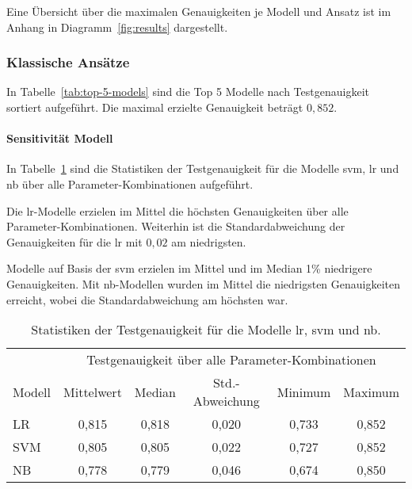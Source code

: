 Eine Übersicht über die maximalen Genauigkeiten je Modell und Ansatz ist im Anhang in Diagramm~\ref{fig:results} dargestellt.

\subsubsection{Klassische Ansätze}\label{subsubsec:ergebnisse-klassische-ansaetze}

In Tabelle~\ref{tab:top-5-models} sind die Top 5 Modelle nach Testgenauigkeit sortiert aufgeführt.
Die maximal erzielte Genauigkeit beträgt $0,852$.

\paragraph{Sensitivität Modell}
In Tabelle~\ref{tab:stats-per-model} sind die Statistiken der Testgenauigkeit für die Modelle \gls{svm}, \gls{lr} und \gls{nb} über alle Parameter-Kombinationen aufgeführt.

Die \gls{lr}-Modelle erzielen im Mittel die höchsten Genauigkeiten über alle Parameter-Kombinationen.
Weiterhin ist die Standardabweichung der Genauigkeiten für die \gls{lr} mit $0,02$ am niedrigsten.

Modelle auf Basis der \gls{svm} erzielen im Mittel und im Median 1\% niedrigere Genauigkeiten.
Mit \gls{nb}-Modellen wurden im Mittel die niedrigsten Genauigkeiten erreicht, wobei die Standardabweichung am höchsten war.

\begin{table}
    \center
    \begin{tabular}{lccccc}
        \toprule
        & \multicolumn{5}{c}{Testgenauigkeit über alle Parameter-Kombinationen} \\
        Modell             & Mittelwert & Median & Std.-Abweichung & Minimum & Maximum \\
        \midrule
        LR                 & 0,815      & 0,818  & 0,020           & 0,733   & 0,852 \\
        SVM                & 0,805      & 0,805  & 0,022           & 0,727   & 0,852 \\
        NB                 & 0,778      & 0,779  & 0,046           & 0,674   & 0,850 \\
        \bottomrule
    \end{tabular}
    \caption{Statistiken der Testgenauigkeit für die Modelle \gls{lr}, \gls{svm} und \gls{nb}.}
    \label{tab:stats-per-model}
\end{table}

